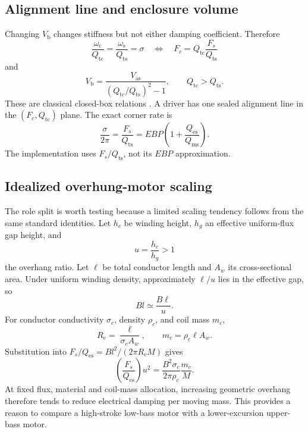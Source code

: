 \documentclass[11pt,a4paper]{article}
\numberwithin{equation}{section}
\newcommand{\Mms}{M}
\renewcommand{\Re}{R_{\mathrm{e}}}
\newcommand{\Bl}{Bl}
\newcommand{\Qes}{Q_{\mathrm{es}}}
\newcommand{\Qms}{Q_{\mathrm{ms}}}
\newcommand{\Qts}{Q_{\mathrm{ts}}}
\newcommand{\Qtc}{Q_{\mathrm{tc}}}
\newcommand{\Vas}{V_{\mathrm{as}}}
\newcommand{\Vb}{V_{\mathrm{b}}}
\newcommand{\ws}{\omega_{\mathrm{s}}}
\newcommand{\wc}{\omega_{\mathrm{c}}}
\begin{document}
\subsection{Alignment line and enclosure volume}
\label{sec:model-alignment}

Changing $\Vb$ changes stiffness but not either damping coefficient.
Therefore
\begin{equation}
	\boxed{
	\frac{\wc}{\Qtc}=\frac{\ws}{\Qts}=\sigma
	\quad\Longleftrightarrow\quad
	F_c=\Qtc\frac{F_s}{\Qts}}
	\label{eq:alignment}
\end{equation}
and
\begin{equation}
	\boxed{
	\Vb=\frac{\Vas}{(\Qtc/\Qts)^2-1}},
	\qquad \Qtc>\Qts .
	\label{eq:boxvolume}
\end{equation}
These are classical closed-box relations \cite{small1972}.  A driver has
one sealed alignment line in the $(F_c,\Qtc)$ plane.  The exact corner rate
is
\begin{equation}
	\frac{\sigma}{2\pi}=\frac{F_s}{\Qts}
	=EBP\left(1+\frac{\Qes}{\Qms}\right).
	\label{eq:cornerrate}
\end{equation}
The implementation uses $F_s/\Qts$, not its $EBP$ approximation.

\subsection*{Idealized overhung-motor scaling}

The role split is worth testing because a limited scaling tendency follows
from the same standard identities.  Let $h_c$ be winding height, $h_g$ an
effective uniform-flux gap height, and
\begin{equation}
	u=\frac{h_c}{h_g}>1
\end{equation}
the overhang ratio.  Let $\ell$ be total conductor length and $A_w$ its
cross-sectional area.  Under uniform winding density, approximately
$\ell/u$ lies in the effective gap, so
\begin{equation}
	\Bl\simeq\frac{B\ell}{u}.
	\label{eq:Bl-overhang}
\end{equation}
For conductor conductivity $\sigma_c$, density $\rho_c$, and coil mass
$m_c$,
\begin{equation}
	\Re=\frac{\ell}{\sigma_cA_w},
	\qquad
	m_c=\rho_c\ell A_w.
	\label{eq:coil-material}
\end{equation}
Substitution into
$F_s/\Qes=\Bl^2/(2\pi\Re\Mms)$ gives
\begin{equation}
	\boxed{
	\left(\frac{F_s}{\Qes}\right)u^2
	=\frac{B^2\sigma_c}{2\pi\rho_c}\frac{m_c}{\Mms}} .
	\label{eq:motor-scaling}
\end{equation}
At fixed flux, material and coil-mass allocation, increasing geometric
overhang therefore tends to reduce electrical damping per moving mass.
This provides a reason to compare a high-stroke low-bass motor with a
lower-excursion upper-bass motor.
\end{document}
